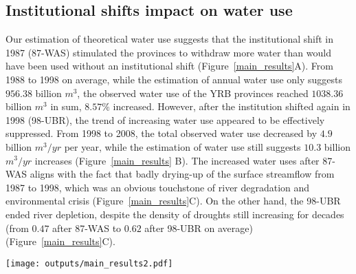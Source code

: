 
\subsection{Institutional shifts impact on water use}
\label{result-2}

\label{result-1-p2}
Our estimation of theoretical water use suggests that the institutional shift in 1987 (87-WAS) stimulated the provinces to withdraw more water than would have been used without an institutional shift (Figure~\ref{main_results}A).
From 1988 to 1998 on average, while the estimation of annual water use only suggests $956.38$ billion $m^3$, the observed water use of the YRB provinces reached $1038.36$ billion $m^3$ in sum, $8.57\%$ increased.
However, after the institution shifted again in 1998 (98-UBR), the trend of increasing water use appeared to be effectively suppressed. From 1998 to 2008, the total observed water use decreased by $4.9$ billion $m^3/yr$ per year, while the estimation of water use still suggests $10.3$ billion $m^3/yr$ increases (Figure~\ref{main_results} B).
The increased water uses after 87-WAS aligns with the fact that badly drying-up of the surface streamflow from 1987 to 1998, which was an obvious touchstone of river degradation and environmental crisis (Figure~\ref{main_results}C).
On the other hand, the 98-UBR ended river depletion, despite the density of droughts still increasing for decades (from $0.47$ after 87-WAS to $0.62$ after 98-UBR on average) (Figure~\ref{main_results}C).

\begin{figure*}[!h]
    \centering
    \texttt{[image: outputs/main\_results2.pdf]}
    \caption{
        Effects of two institutional shifts on water resources use and allocation in the Yellow River Basin (YRB).
        \textbf{A.} water uses of the YRB before and after the institutional shift in 1987 (87-WAS);
        \textbf{B.} water uses of the YRB before and after the institutional shift in 1998 (98-UBR). While the blue lines are statistic water use data, the grey ones are the estimation from the Differenced Synthetic Control method with economic and environmental background controlled.
        \textbf{C.} Drought intensity in the YRB and drying up events of the Yellow River. The size of the grey bubbles denotes the length of a drying upstream.
    }
    \label{main_results}
\end{figure*}


